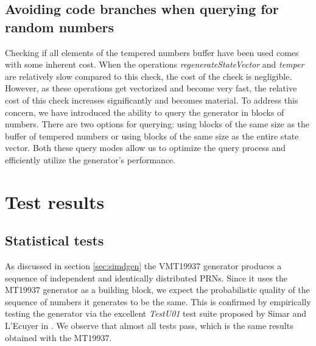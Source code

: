 \documentclass[preprint,1p,times]{elsarticle}
\begin{document}
			\subsection{Avoiding code branches when querying for random numbers}
			\label{seq:blocks}
			Checking if all elements of the tempered numbers buffer have been used comes with some inherent cost. When the operations \textit{regenerateStateVector} and \textit{temper} are relatively slow compared to this check, the cost of the check is negligible. However, as these operations get vectorized and become very fast, the relative cost of this check increases significantly and becomes material. To address this concern, we have introduced the ability to query the generator in blocks of numbers. There are two options for querying: using blocks of the same size as the buffer of tempered numbers or using blocks of the same size as the entire state vector. Both these query modes allow us to optimize the query process and efficiently utilize the generator's performance.
			
			\section{Test results}
			
			\subsection{Statistical tests}
			As discussed in section \ref{sec:simdgen} the VMT19937 generator produces a sequence of independent and identically distributed PRNs. Since it uses the MT19937 generator as a building block, we expect the probabilistic quality of the sequence of numbers it generates to be the same. This is confirmed by empirically testing the generator via the excellent \textit{TestU01} test suite proposed by Simar and L'Ecuyer in \cite{testu01}. We observe that almost all tests pass, which is the same results obtained with the MT19937.
			
\end{document}
